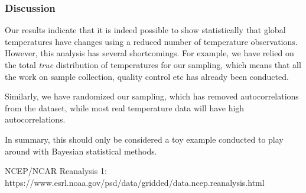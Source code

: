 \documentclass[letter, pt=10]{scrartcl}
\begin{document}
\subsubsection{Discussion}
Our results indicate that it is indeed possible to show statistically that global temperatures have changes using a reduced number of temperature observations. However, this analysis has several shortcomings. For example, we have relied on the total \emph{true} distribution of temperatures for our sampling, which means that all the work on sample collection, quality control etc has already been conducted. 

Similarly, we have randomized our sampling, which has removed autocorrelations from the dataset, while most real temperature data will have high autocorrelations. 

In summary, this should only be considered a toy example conducted to play around with Bayesian statistical methods. 

%


NCEP/NCAR Reanalysis 1: https://www.esrl.noaa.gov/psd/data/gridded/data.ncep.reanalysis.html

\end{document}
